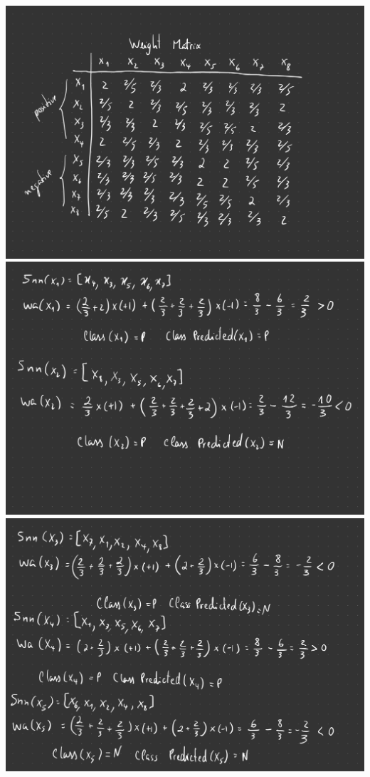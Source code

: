 \documentclass[12pt]{article}
\begin{document}
\begin{enumerate}[leftmargin=\labelsep]
\begin{center}
\includegraphics[scale=0.2]{images/Project-04.jpg}
\newline
\includegraphics[scale=0.2]{images/Project-05.jpg}
\newline
\includegraphics[scale=0.2]{images/Project-06.jpg}

\end{center}
\end{enumerate}
\end{document}
